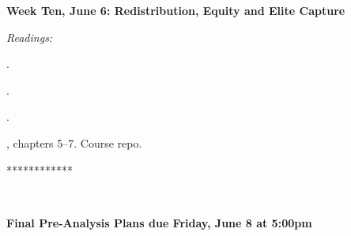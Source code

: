 \documentclass[11pt]{article}
\begin{document}
\textbf {Week Ten, June 6: Redistribution, Equity and Elite Capture}

\textit{Readings:}

\href{doi:10.1016/j.jdeveco.2006.01.004}{}.

\href{http://www.jstor.org/stable/40060150}{}.

\href{http://www.nber.org/papers/w18798}{}.

, chapters 5--7. Course repo.
\bigskip

\centerline{************}\\

\bigskip
\centerline{\textbf{Final Pre-Analysis Plans due Friday, June 8 at 5:00pm}}
\end{document}

